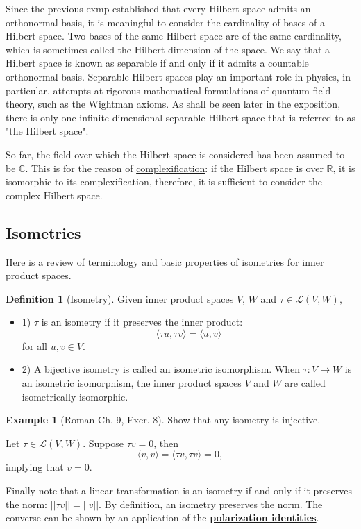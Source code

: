 \documentclass{article}
\theoremstyle{definition}
\newtheorem{exmp}[thm]{Example}
\newtheorem{defn}[thm]{Definition}
\theoremstyle{remark}
\numberwithin{equation}{section}
\begin{document}
Since the previous exmp established that every Hilbert space admits an orthonormal basis, it is meaningful to consider the cardinality of bases of a Hilbert space. Two bases of the same Hilbert space are of the same cardinality, which is sometimes called the Hilbert dimension of the space. We say that a Hilbert space is known as separable if and only if it admits a countable orthonormal basis. Separable Hilbert spaces play an important role in physics, in particular, attempts at rigorous mathematical formulations of quantum field theory, such as the Wightman axioms. As shall be seen later in the exposition, there is only one infinite-dimensional separable Hilbert space that is referred to as "the Hilbert space". 

So far, the field over which the Hilbert space is considered has been assumed to be $\mathbb{C}$. This is for the reason of \href{https://www.wikiwand.com/en/Complexification}{complexification}: if the Hilbert space is over $\mathbb{R}$, it is isomorphic to its complexification, therefore, it is sufficient to consider the complex Hilbert space.  

\subsection{Isometries}
Here is a review of terminology and basic properties of isometries for inner product spaces. 
\begin{defn}[Isometry]
Given inner product spaces $V$, $W$ and $\tau \in \mathcal{L} (V, W),$ 
\begin{itemize}
    \item 1) $\tau$ is an isometry if it preserves the inner product: 
    $$\langle \tau u, \tau v \rangle = \langle u, v \rangle $$
    for all $u, v \in V$.
    \item 2) A bijective isometry is called an isometric isomorphism. When $\tau: V \rightarrow W$ is an isometric isomorphism, the inner product spaces $V$ and $W$ are called isometrically isomorphic. 
\end{itemize}
\end{defn}

\begin{exmp}[Roman Ch. 9, Exer. 8]
Show that any isometry is injective. 

Let $\tau \in \mathcal{L} (V, W)$. Suppose $\tau v = 0$, then 
$$\langle v, v \rangle = \langle \tau v, \tau v \rangle = 0,$$
implying that $v = 0$. 
\end{exmp}
Finally note that a linear transformation is an isometry if and only if it preserves the norm: $||\tau v|| = ||v||$. By definition, an isometry preserves the norm. The converse can be shown by an application of the  \textbf{\href{https://www.wikiwand.com/en/Polarization_identity}{polarization identities}}.
\end{document}
